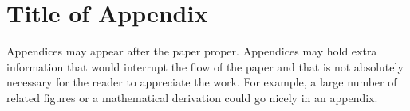 %

\appendix


\section{Title of Appendix}  

Appendices may appear after the paper proper.  Appendices may hold
extra information that would interrupt the flow of the paper and that
is not absolutely necessary for the reader to appreciate the work.
For example, a large number of related figures or a mathematical
derivation could go nicely in an appendix.
